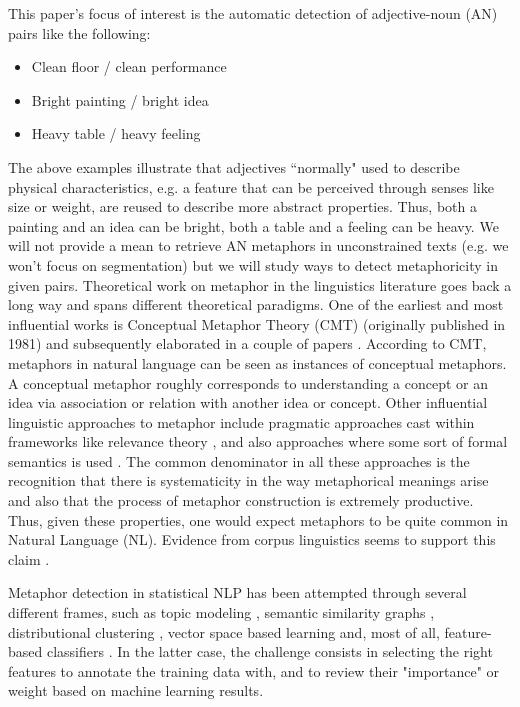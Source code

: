 This paper's focus of interest is the automatic detection of adjective-noun (AN) pairs like the following:
\begin{itemize}[topsep=0em,itemsep=0em,partopsep=0em,parsep=0em]
	\item Clean floor / clean performance
	\item Bright painting / bright idea
	\item Heavy table / heavy feeling
\end{itemize}
The above examples illustrate that adjectives  ``normally" used to describe physical characteristics, e.g. a feature that can be perceived through senses like size or weight, are reused to describe more abstract properties. Thus, both a painting and an idea can be bright, both a table and a feeling can be heavy. We will not provide a mean to retrieve AN metaphors in unconstrained texts (e.g. we won't focus on segmentation) but we will study ways to detect metaphoricity in given pairs. Theoretical work on metaphor in the linguistics literature goes back a long way and spans different theoretical paradigms. One of the earliest and most influential works is Conceptual Metaphor Theory (CMT) \cite{Lakoff:2008} (originally published in 1981) and subsequently elaborated in a couple of papers \cite{lakoff1989some,lakoff1993contemporary}. According to CMT, metaphors in natural language can be seen as instances of conceptual metaphors. A conceptual metaphor  roughly corresponds to understanding a concept or an idea via association or relation with another idea or concept. Other influential linguistic approaches to metaphor include pragmatic approaches cast within frameworks like relevance theory \cite{romero2014relevance,wilson2011parallels},  and also approaches where some sort of formal semantics is used   \cite{vogel2001dynamic}. The common denominator in all these approaches  is the recognition that there is systematicity in the way metaphorical meanings arise and also that the process of metaphor construction is extremely productive. Thus, given these properties, one would expect metaphors to be quite common in Natural Language (NL). Evidence from corpus linguistics  seems to support this claim \cite{cameron2003metaphor}. 

Metaphor detection in statistical NLP has been attempted through several different frames, such as topic modeling \cite{Li:2010:UGM:1857999.1858038}, semantic similarity graphs \citep{li:2010}, distributional clustering \citep{shutova:2010}, vector space based learning \cite{gutierrez2016literal} and, most of all, feature-based classifiers \cite{Tsvetkov_metaphordetection}. In the latter case, the challenge consists in selecting the right features to annotate the training data with, and to review their "importance" or weight based on machine learning results. 

